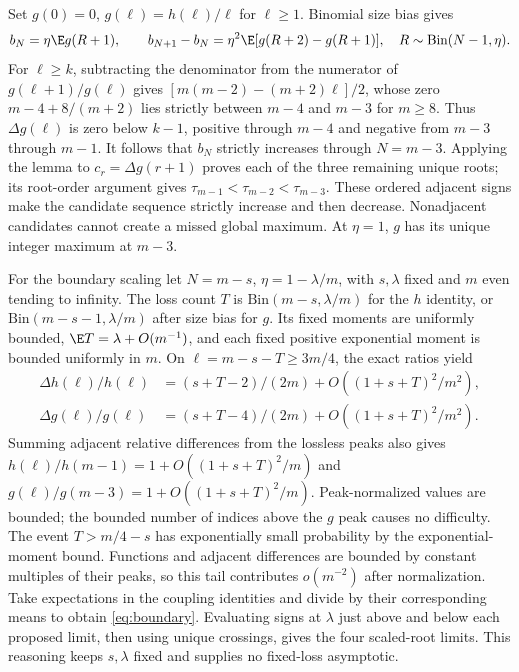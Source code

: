 Set $g(0)=0$, $g(\ell)=h(\ell)/\ell$ for $\ell\ge1$. Binomial size bias gives
\begin{equation}
 b_N=\eta\E g(R+1),\qquad b_{N+1}-b_N=\eta^2\E[g(R+2)-g(R+1)],\quad R\sim\mathrm{Bin}(N-1,\eta).
\end{equation}
For $\ell\ge k$, subtracting the denominator from the numerator of $g(\ell+1)/g(\ell)$ gives $[m(m-2)-(m+2)\ell]/2$, whose zero $m-4+8/(m+2)$ lies strictly between $m-4$ and $m-3$ for $m\ge8$. Thus $\Delta g(\ell)$ is zero below $k-1$, positive through $m-4$ and negative from $m-3$ through $m-1$. It follows that $b_N$ strictly increases through $N=m-3$. Applying the lemma to $c_r=\Delta g(r+1)$ proves each of the three remaining unique roots; its root-order argument gives $\tau_{m-1}<\tau_{m-2}<\tau_{m-3}$. These ordered adjacent signs make the candidate sequence strictly increase and then decrease. Nonadjacent candidates cannot create a missed global maximum. At $\eta=1$, $g$ has its unique integer maximum at $m-3$.

For the boundary scaling let $N=m-s$, $\eta=1-\lambda/m$, with $s,\lambda$ fixed and $m$ even tending to infinity. The loss count $T$ is $\mathrm{Bin}(m-s,\lambda/m)$ for the $h$ identity, or $\mathrm{Bin}(m-s-1,\lambda/m)$ after size bias for $g$. Its fixed moments are uniformly bounded, $\E T=\lambda+O(m^{-1})$, and each fixed positive exponential moment is bounded uniformly in $m$. On $\ell=m-s-T\ge3m/4$, the exact ratios yield
\begin{align}
 \Delta h(\ell)/h(\ell)&=(s+T-2)/(2m)+O((1+s+T)^2/m^2),\\
 \Delta g(\ell)/g(\ell)&=(s+T-4)/(2m)+O((1+s+T)^2/m^2).
\end{align}
Summing adjacent relative differences from the lossless peaks also gives $h(\ell)/h(m-1)=1+O((1+s+T)^2/m)$ and $g(\ell)/g(m-3)=1+O((1+s+T)^2/m)$. Peak-normalized values are bounded; the bounded number of indices above the $g$ peak causes no difficulty. The event $T>m/4-s$ has exponentially small probability by the exponential-moment bound. Functions and adjacent differences are bounded by constant multiples of their peaks, so this tail contributes $o(m^{-2})$ after normalization. Take expectations in the coupling identities and divide by their corresponding means to obtain \cref{eq:boundary}. Evaluating signs at $\lambda$ just above and below each proposed limit, then using unique crossings, gives the four scaled-root limits. This reasoning keeps $s,\lambda$ fixed and supplies no fixed-loss asymptotic.

